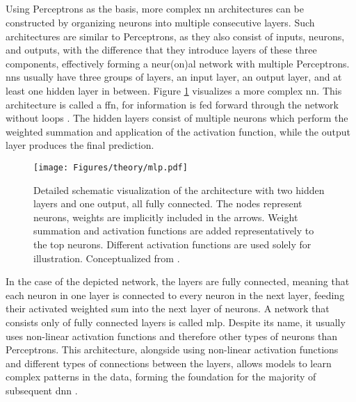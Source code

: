 \subsection{}
\label{subsec:mlp}

Using Perceptrons as the basis, more complex \gls{nn} architectures can be constructed by organizing neurons into multiple consecutive layers. Such architectures are similar to Perceptrons, as they also consist of inputs, neurons, and outputs, with the difference that they introduce layers of these three components, effectively forming a neur(on)al network with multiple Perceptrons. \glspl{nn} usually have three groups of layers, an input layer, an output layer, and at least one hidden layer in between. Figure \ref{fig:mlp} visualizes a more complex \gls{nn}. This architecture is called a \gls{ffn}, for information is fed forward through the network without loops \autocite{Nielsen2015,Sarker2021,Szeliski2022}. The hidden layers consist of multiple neurons which perform the weighted summation and application of the activation function, while the output layer produces the final prediction.

\begin{figure}[htbp]
    \centering
    \texttt{[image: Figures/theory/mlp.pdf]}
    \caption[ Architecture]{Detailed schematic visualization of the  architecture with two hidden layers and one output, all fully connected. The nodes represent neurons, weights are implicitly included in the arrows. Weight summation and activation functions are added representatively to the top neurons. Different activation functions are used solely for illustration. Conceptualized from \textcite{Bernard2021,Nielsen2015,Szeliski2022}.}
    \label{fig:mlp}
\end{figure}

In the case of the depicted network, the layers are fully connected, meaning that each neuron in one layer is connected to every neuron in the next layer, feeding their activated weighted sum into the next layer of neurons. A network that consists only of fully connected layers is called \gls{mlp}. Despite its name, it usually uses non-linear activation functions and therefore other types of neurons than Perceptrons. This architecture, alongside using non-linear activation functions and different types of connections between the layers, allows models to learn complex patterns in the data, forming the foundation for the majority of subsequent \gls{dnn} \autocite{Goodfellow.Bengio.ea2016,Szeliski2022,Zhang.Lipton.ea2023}.

